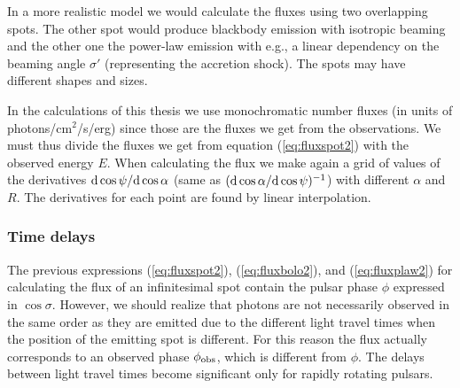 \documentclass{wihuri}
\def\msun{{\rm M_{\odot}}}
\def\d{{\rm d}}
\def\phiobs{\phi_{\rm obs}}
\begin{document}
In a more realistic model we would calculate the fluxes using two overlapping spots. The other spot would produce blackbody emission with isotropic beaming and the other one the power-law emission with e.g., a linear dependency on the beaming angle $\sigma'$ (representing the accretion shock). The spots may have different shapes and sizes. %


In the calculations of this thesis we use monochromatic number fluxes (in units of photons/cm$^{2}$/s/erg) since those are the fluxes we get from the observations. We must thus divide the fluxes we get from equation (\ref{eq:fluxspot2}) with the observed energy $E$. When calculating the flux we make again a grid of values of the derivatives $\d\cos\psi / \d\cos\alpha$ (same as $(\d\cos\alpha / \d\cos\psi)^{-1}$) with different $\alpha$ and $R$. The derivatives for each point are found by linear interpolation. 


\subsubsection{Time delays}



The previous expressions (\ref{eq:fluxspot2}), (\ref{eq:fluxbolo2}), and (\ref{eq:fluxplaw2}) for calculating the flux of an infinitesimal spot
contain the pulsar phase $\phi$ expressed in $\cos\sigma$. However, we should realize that photons are not necessarily observed in the same order as they are emitted due to the different light travel times when the position of the emitting spot is different. For this reason the flux actually corresponds to an observed phase $\phiobs$, which is different from $\phi$. The delays between light travel times become significant only for rapidly rotating pulsars. %

   
\end{document}
